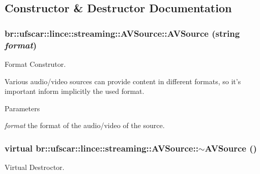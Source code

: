 \subsection{Constructor \& Destructor Documentation}
\hypertarget{classbr_1_1ufscar_1_1lince_1_1streaming_1_1AVSource_a95fc248b15a4f203ac68e97da703b771}{
\subsubsection[{AVSource}]{\setlength{\rightskip}{0pt plus 5cm}br::ufscar::lince::streaming::AVSource::AVSource (string {\em format})}}
\label{classbr_1_1ufscar_1_1lince_1_1streaming_1_1AVSource_a95fc248b15a4f203ac68e97da703b771}


Format Construtor. 

Various audio/video sources can provide content in different formats, so it's important inform implicitly the used format. 
\begin{DoxyParams}{Parameters}
\item[{\em format}]the format of the audio/video of the source. \end{DoxyParams}
\hypertarget{classbr_1_1ufscar_1_1lince_1_1streaming_1_1AVSource_af816deeeec9a44dbaba113dc91612d26}{
\subsubsection[{$\sim$AVSource}]{\setlength{\rightskip}{0pt plus 5cm}virtual br::ufscar::lince::streaming::AVSource::$\sim$AVSource ()}}
\label{classbr_1_1ufscar_1_1lince_1_1streaming_1_1AVSource_af816deeeec9a44dbaba113dc91612d26}


Virtual Destroctor. 



